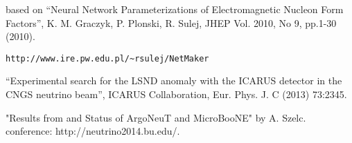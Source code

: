 \begin{thebibliography}{99}
 based on
``Neural Network Parameterizations of Electromagnetic Nucleon Form Factors'', K. M. Graczyk, P. Plonski, R. Sulej, JHEP Vol. 2010, No 9, pp.1-30 (2010).
\begin{verbatim}
http://www.ire.pw.edu.pl/~rsulej/NetMaker
\end{verbatim}

 ``Experimental search for the LSND anomaly with the ICARUS
detector in the CNGS neutrino beam'', ICARUS Collaboration, Eur. Phys. J. C (2013) 73:2345.

 "Results from and Status of ArgoNeuT
and MicroBooNE" by A. Szelc. conference: http://neutrino2014.bu.edu/.

\end{thebibliography}
